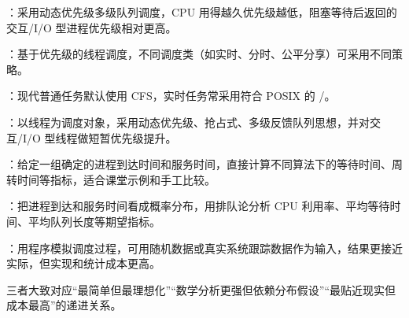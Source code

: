 \begin{points}
  \item {}：采用动态优先级多级队列调度，CPU 用得越久优先级越低，阻塞等待后返回的交互/I/O 型进程优先级相对更高。
  \item {}：基于优先级的线程调度，不同调度类（如实时、分时、公平分享）可采用不同策略。
  \item {}：现代普通任务默认使用 CFS，实时任务常采用符合 POSIX 的 /。
  \item {}：以线程为调度对象，采用动态优先级、抢占式、多级反馈队列思想，并对交互/I/O 型线程做短暂优先级提升。
\end{points}


\begin{points}
  \item {}：给定一组确定的进程到达时间和服务时间，直接计算不同算法下的等待时间、周转时间等指标，适合课堂示例和手工比较。
  \item {}：把进程到达和服务时间看成概率分布，用排队论分析 CPU 利用率、平均等待时间、平均队列长度等期望指标。
  \item {}：用程序模拟调度过程，可用随机数据或真实系统跟踪数据作为输入，结果更接近实际，但实现和统计成本更高。
  \item 三者大致对应“最简单但最理想化”“数学分析更强但依赖分布假设”“最贴近现实但成本最高”的递进关系。
\end{points}

